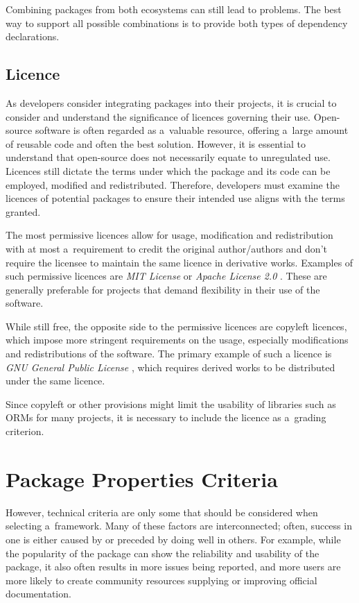 Combining packages from both ecosystems can still lead to problems. The best way
to support all possible combinations is to provide both types of dependency
declarations.

\subsection{Licence}
As developers consider integrating packages into their projects, it is crucial
to consider and understand the significance of licences governing their use.
Open-source software is often regarded as a~valuable resource, offering a~large
amount of reusable code and often the best solution. However, it is essential to
understand that open-source does not necessarily equate to unregulated use.
Licences still dictate the terms under which the package and its code can be
employed, modified and redistributed. Therefore, developers must examine the
licences of potential packages to ensure their intended use aligns with the
terms granted.

The most permissive licences allow for usage, modification and redistribution
with at most a~requirement to credit the original author/authors and don't
require the licensee to maintain the same licence in derivative works. Examples
of such permissive licences are \textit{MIT License} \cite{MITLicense} or
\textit{Apache License 2.0} \cite{ApacheLicense2}. These are generally preferable
for projects that demand flexibility in their use of the software.

While still free, the opposite side to the permissive licences are copyleft
licences, which impose more stringent requirements on the usage, especially
modifications and redistributions of the software. The primary example of such a
licence is \textit{GNU General Public License} \cite{GNUGPL}, which requires
derived works to be distributed under the same licence.

Since copyleft or other provisions might limit the usability of libraries such
as ORMs for many projects, it is necessary to include the licence as a~grading
criterion.

\section{Package Properties Criteria}

However, technical criteria are only some that should be considered when
selecting a~framework. Many of these factors are interconnected; often, success
in one is either caused by or preceded by doing well in others. For example,
while the popularity of the package can show the reliability and usability of
the package, it also often results in more issues being reported, and more
users are more likely to create community resources supplying or improving
official documentation.

